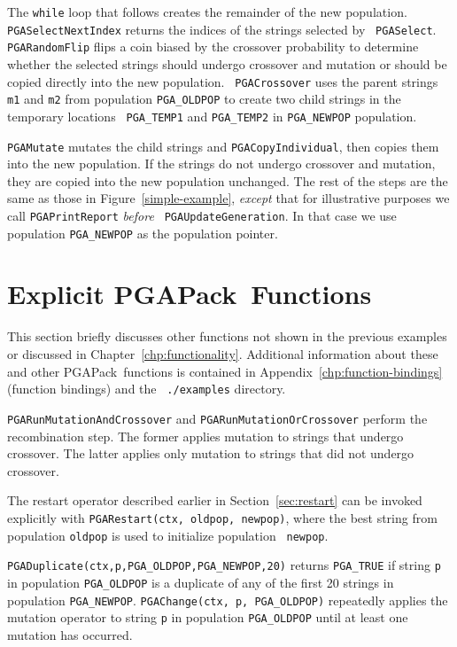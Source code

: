 \documentclass{report}
\newcommand{\pga}{PGAPack}
\begin{document}
The {\tt while} loop that follows creates the remainder of the new population.
{\tt PGASelectNextIndex} returns the indices of the strings selected by {\tt
PGASelect}.  {\tt PGARandomFlip} flips a coin biased by the crossover
probability to determine whether the selected strings should undergo crossover
and mutation or should be copied directly into the new population.  {\tt
PGACrossover} uses the parent strings {\tt m1} and {\tt m2} from population
{\tt PGA\_OLDPOP} to create two child strings in the temporary locations {\tt
PGA\_TEMP1} and {\tt PGA\_TEMP2} in {\tt PGA\_NEWPOP} population.

{\tt PGAMutate} mutates the child strings and {\tt PGACopyIndividual}, then
copies them into the new population.  If the strings do not undergo crossover
and mutation, they are copied into the new population unchanged.  The rest of
the steps are the same as those in Figure~\ref{simple-example}, {\em except}
that for illustrative purposes we call {\tt PGAPrintReport} {\em before} {\tt
PGAUpdateGeneration}.  In that case we use population {\tt PGA\_NEWPOP} as the
population pointer.

\section{Explicit \pga\ Functions}

This section briefly discusses other functions not shown in the previous
examples or discussed in Chapter~\ref{chp:functionality}.  Additional
information about these and other \pga\ functions is contained in
Appendix~\ref{chp:function-bindings} (function bindings) and the {\tt
./examples} directory.

{\tt PGARunMutationAndCrossover} and {\tt PGARunMutationOrCrossover} perform
the recombination step.  The former applies mutation to strings that undergo
crossover.  The latter applies only mutation to strings that did not undergo
crossover.

The restart operator described earlier in Section~\ref{sec:restart} can be
invoked explicitly with {\tt PGARestart(ctx, oldpop, newpop)}, where the best
string from population {\tt oldpop} is used to initialize population {\tt
newpop}.

\begin{sloppypar}
{\tt PGADuplicate(ctx,p,PGA\_OLDPOP,PGA\_NEWPOP,20)} returns {\tt PGA\_TRUE}
if string {\tt p} in population {\tt PGA\_OLDPOP} is a duplicate of any of the
first 20 strings in population {\tt PGA\_NEWPOP}.  {\tt PGAChange(ctx, p,
PGA\_OLDPOP)} repeatedly applies the mutation operator to string {\tt p} in
population {\tt PGA\_OLDPOP} until at least one mutation has occurred.
\end{sloppypar}
\end{document}
